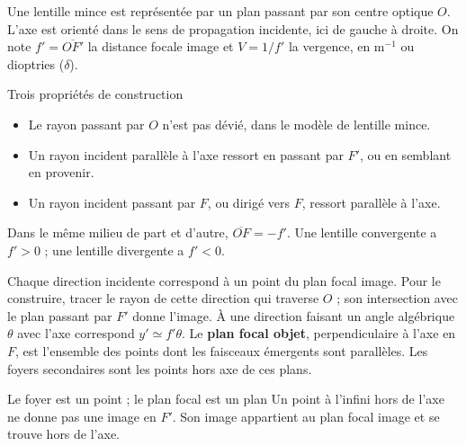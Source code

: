 Une lentille mince est représentée par un plan passant par son centre optique $O$. L'axe est orienté dans le sens de propagation incidente, ici de gauche à droite. On note $f'=\overline{OF'}$ la distance focale image et $V=1/f'$ la vergence, en $\mathrm{m^{-1}}$ ou dioptries ($\delta$).
\begin{loi}{Trois propriétés de construction}
\begin{itemize}
\item Le rayon passant par $O$ n'est pas dévié, dans le modèle de lentille mince.
\item Un rayon incident parallèle à l'axe ressort en passant par $F'$, ou en semblant en provenir.
\item Un rayon incident passant par $F$, ou dirigé vers $F$, ressort parallèle à l'axe.
\end{itemize}
Dans le même milieu de part et d'autre, $\overline{OF}=-f'$. Une lentille convergente a $f'>0$ ; une lentille divergente a $f'<0$.
\end{loi}
Chaque direction incidente correspond à un point du plan focal image. Pour le construire, tracer le rayon de cette direction qui traverse $O$ ; son intersection avec le plan passant par $F'$ donne l'image. À une direction faisant un angle algébrique $\theta$ avec l'axe correspond $y'\simeq f'\theta$.
Le \textbf{plan focal objet}, perpendiculaire à l'axe en $F$, est l'ensemble des points dont les faisceaux émergents sont parallèles. Les foyers secondaires sont les points hors axe de ces plans.
\begin{piege}{Le foyer est un point ; le plan focal est un plan}
Un point à l'infini hors de l'axe ne donne pas une image en $F'$. Son image appartient au plan focal image et se trouve hors de l'axe.
\end{piege}

